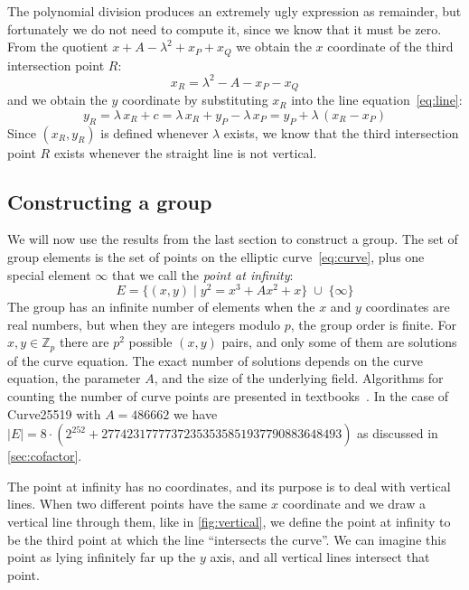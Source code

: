 \documentclass[manuscript]{acmart}
\begin{document}
The polynomial division produces an extremely ugly expression as remainder, but fortunately we do not need to compute it, since we know that it must be zero.
From the quotient $x + A - \lambda^2 + x_P + x_Q$ we obtain the $x$ coordinate of the third intersection point $R$:
\begin{equation}
x_R = \lambda^2 - A - x_P - x_Q \label{eq:xR}
\end{equation}
and we obtain the $y$ coordinate by substituting $x_R$ into the line equation~\eqref{eq:line}:
\begin{equation}
y_R = \lambda\,x_R + c = \lambda\,x_R + y_P - \lambda\,x_P = y_P + \lambda\,(x_R - x_P) \label{eq:yR}
\end{equation}
Since $(x_R, y_R)$ is defined whenever $\lambda$ exists, we know that the third intersection point $R$ exists whenever the straight line is not vertical.

\subsection{Constructing a group}\label{sec:group-construction}

We will now use the results from the last section to construct a group.
The set of group elements is the set of points on the elliptic curve~\eqref{eq:curve}, plus one special element $\infty$ that we call the \emph{point at infinity}:
\begin{equation}
E = \{(x,y) \mid y^2 = x^3 + A x^2 + x\} \;\cup\; \{\infty\}
\end{equation}
The group has an infinite number of elements when the $x$ and $y$ coordinates are real numbers, but when they are integers modulo $p$, the group order is finite.
For $x, y \in \mathbb{Z}_p$ there are $p^2$ possible $(x, y)$ pairs, and only some of them are solutions of the curve equation.
The exact number of solutions depends on the curve equation, the parameter $A$, and the size of the underlying field.
Algorithms for counting the number of curve points are presented in textbooks~\cite{Blake:1999,Cohen:2006}.
In the case of Curve25519 with $A = 486662$ we have $|E| = 8 \cdot (2^{252} + 27742317777372353535851937790883648493)$ as discussed in \autoref{sec:cofactor}.

The point at infinity has no coordinates, and its purpose is to deal with vertical lines.
When two different points have the same $x$ coordinate and we draw a vertical line through them, like in \autoref{fig:vertical}, we define the point at infinity to be the third point at which the line ``intersects the curve''.
We can imagine this point as lying infinitely far up the $y$ axis, and all vertical lines intersect that point.
\end{document}
